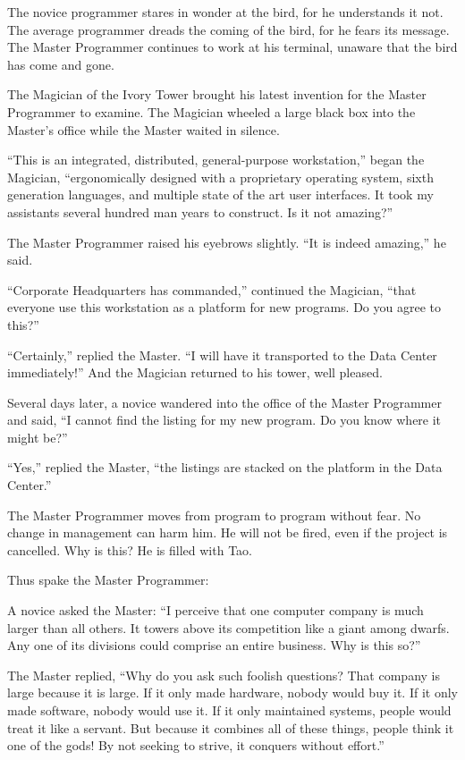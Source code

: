 The novice programmer stares in wonder at the bird, for he understands
it not. The average programmer dreads the coming of the bird, for he
fears its message. The Master Programmer continues to work at his
terminal, unaware that the bird has come and gone.

The Magician of the Ivory Tower brought his latest invention for the
Master Programmer to examine. The Magician wheeled a large black box
into the Master's office while the Master waited in silence.

``This is an integrated, distributed, general-purpose workstation,''
began the Magician, ``ergonomically designed with a proprietary
operating system, sixth generation languages, and multiple state of
the art user interfaces. It took my assistants several hundred man
years to construct. Is it not amazing?''

The Master Programmer raised his eyebrows slightly. ``It is indeed
amazing,'' he said.

``Corporate Headquarters has commanded,'' continued the Magician,
``that everyone use this workstation as a platform for new
programs. Do you agree to this?''

``Certainly,'' replied the Master. ``I will have it transported to the
Data Center immediately!'' And the Magician returned to his tower,
well pleased.

Several days later, a novice wandered into the office of the Master
Programmer and said, ``I cannot find the listing for my new
program. Do you know where it might be?''

``Yes,'' replied the Master, ``the listings are stacked on the
platform in the Data Center.''

The Master Programmer moves from program to program without fear. No
change in management can harm him. He will not be fired, even if the
project is cancelled. Why is this? He is filled with Tao.

Thus spake the Master Programmer:

A novice asked the Master: ``I perceive that one computer company is
much larger than all others. It towers above its competition like a
giant among dwarfs. Any one of its divisions could comprise an entire
business. Why is this so?''

The Master replied, ``Why do you ask such foolish questions? That
company is large because it is large. If it only made hardware, nobody
would buy it. If it only made software, nobody would use it. If it
only maintained systems, people would treat it like a servant. But
because it combines all of these things, people think it one of the
gods! By not seeking to strive, it conquers without effort.''

